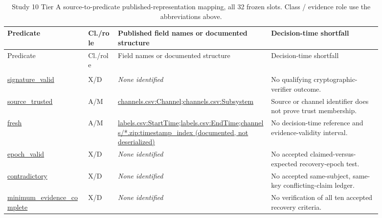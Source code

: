\begingroup
\footnotesize
\setlength{\tabcolsep}{3pt}
\renewcommand{\arraystretch}{1.18}
\begin{longtable}{@{}>{\raggedright\arraybackslash}p{0.19\linewidth}>{\raggedright\arraybackslash}p{0.075\linewidth}>{\raggedright\arraybackslash}p{0.365\linewidth}>{\raggedright\arraybackslash}p{0.26\linewidth}@{}}
\caption{Study 10 Tier A source-to-predicate published-representation mapping, all 32 frozen slots. Class / evidence role use the abbreviations above.}\label{tab:phase2s10fields}\\
\toprule Predicate & Cl./role & Published field names or documented structure & Decision-time shortfall \\
\midrule
\endfirsthead
\toprule Predicate & Cl./role & Field names or documented structure & Decision-time shortfall \\
\midrule
\endhead
\multicolumn{4}{@{}l}{\textbf{ESA v2 Mission 1}}\\
\url{signature_valid} & X/D & \emph{None identified} & No qualifying cryptographic-verifier outcome. \\
\url{source_trusted} & A/M & \url{channels.csv:Channel};\allowbreak \url{channels.csv:Subsystem} & Source or channel identifier does not prove trust membership. \\
\url{fresh} & A/M & \url{labels.csv:StartTime};\allowbreak \url{labels.csv:EndTime};\allowbreak \url{channels/*.zip:timestamp_index (documented, not deserialized)} & No decision-time reference and evidence-validity interval. \\
\url{epoch_valid} & X/D & \emph{None identified} & No accepted claimed-versus-expected recovery-epoch test. \\
\url{contradictory} & X/D & \emph{None identified} & No accepted same-subject, same-key conflicting-claim ledger. \\
\url{minimum_evidence_complete} & X/D & \emph{None identified} & No verification of all ten accepted recovery criteria. \\

\end{longtable}
